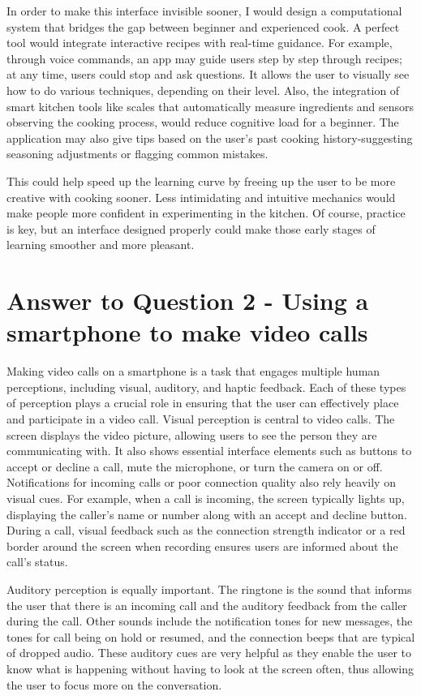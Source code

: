 \documentclass[
	letterpaper, %
]{jdf}
\begin{document}
In order to make this interface invisible sooner, I would design a computational system that bridges the gap between beginner and experienced cook. A perfect tool would integrate interactive recipes with real-time guidance. For example, through voice commands, an app may guide users step by step through recipes; at any time, users could stop and ask questions. It allows the user to visually see how to do various techniques, depending on their level. Also, the integration of smart kitchen tools like scales that automatically measure ingredients and sensors observing the cooking process, would reduce cognitive load for a beginner. The application may also give tips based on the user's past cooking history-suggesting seasoning adjustments or flagging common mistakes.

This could help speed up the learning curve by freeing up the user to be more creative with cooking sooner. Less intimidating and intuitive mechanics would make people more confident in experimenting in the kitchen. Of course, practice is key, but an interface designed properly could make those early stages of learning smoother and more pleasant.
\newpage

\section{Answer to Question 2 - Using a smartphone to make video calls }
Making video calls on a smartphone is a task that engages multiple human perceptions, including visual, auditory, and haptic feedback. Each of these types of perception plays a crucial role in ensuring that the user can effectively place and participate in a video call. Visual perception is central to video calls. The screen displays the video picture, allowing users to see the person they are communicating with. It also shows essential interface elements such as buttons to accept or decline a call, mute the microphone, or turn the camera on or off. Notifications for incoming calls or poor connection quality also rely heavily on visual cues. For example, when a call is incoming, the screen typically lights up, displaying the caller's name or number along with an accept and decline button. During a call, visual feedback such as the connection strength indicator or a red border around the screen when recording ensures users are informed about the call’s status.

Auditory perception is equally important. The ringtone is the sound that informs the user that there is an incoming call and the auditory feedback from the caller during the call. Other sounds include the notification tones for new messages, the tones for call being on hold or resumed, and the connection beeps that are typical of dropped audio. These auditory cues are very helpful as they enable the user to know what is happening without having to look at the screen often, thus allowing the user to focus more on the conversation.
\end{document}

